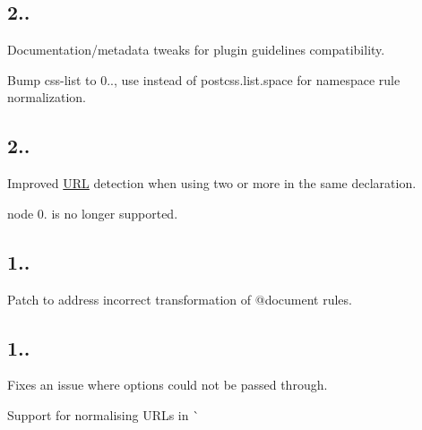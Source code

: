 \subsection*{2..}


\begin{DoxyItemize}
\item Documentation/metadata tweaks for plugin guidelines compatibility.
\item Bump css-\/list to 0.., use instead of postcss.\+list.\+space for namespace rule normalization.
\end{DoxyItemize}

\subsection*{2..}


\begin{DoxyItemize}
\item Improved \mbox{\hyperlink{namespace_u_r_l}{U\+RL}} detection when using two or more in the same declaration.
\item node 0. is no longer supported.
\end{DoxyItemize}

\subsection*{1..}


\begin{DoxyItemize}
\item Patch to address incorrect transformation of {\ttfamily @document} rules.
\end{DoxyItemize}

\subsection*{1..}


\begin{DoxyItemize}
\item Fixes an issue where options could not be passed through.
\item Support for normalising U\+R\+Ls in \`{} 
\end{DoxyItemize}
